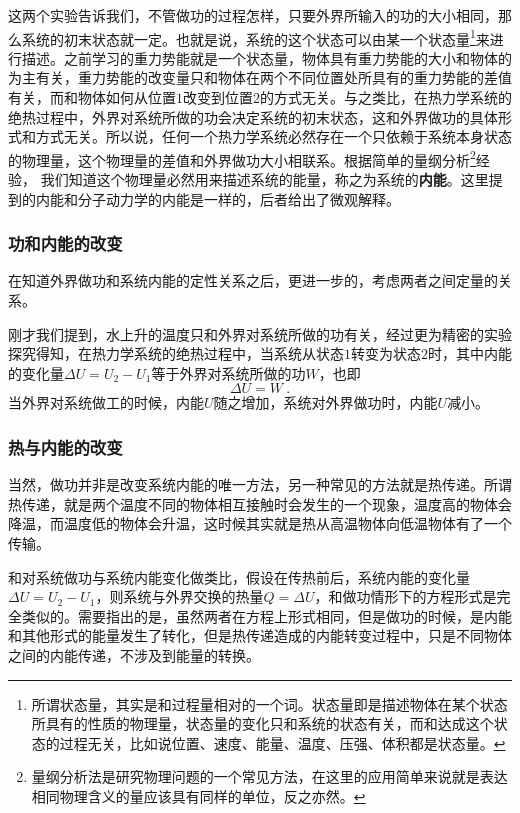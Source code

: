 这两个实验告诉我们，不管做功的过程怎样，只要外界所输入的功的大小相同，那么系统的初末状态就一定。也就是说，系统的这个状态可以由某一个状态量\footnote{所谓状态量，其实是和过程量相对的一个词。状态量即是描述物体在某个状态所具有的性质的物理量，状态量的变化只和系统的状态有关，而和达成这个状态的过程无关，比如说位置、速度、能量、温度、压强、体积都是状态量。}来进行描述。之前学习的重力势能就是一个状态量，物体具有重力势能的大小和物体的为主有关，重力势能的改变量只和物体在两个不同位置处所具有的重力势能的差值有关，而和物体如何从位置$1$改变到位置$2$的方式无关。与之类比，在热力学系统的绝热过程中，外界对系统所做的功会决定系统的初末状态，这和外界做功的具体形式和方式无关。所以说，任何一个热力学系统必然存在一个只依赖于系统本身状态的物理量，这个物理量的差值和外界做功大小相联系。根据简单的量纲分析\footnote{量纲分析法是研究物理问题的一个常见方法，在这里的应用简单来说就是表达相同物理含义的量应该具有同样的单位，反之亦然。}经验，
我们知道这个物理量必然用来描述系统的能量，称之为系统的\textbf{内能}。这里提到的内能和分子动力学的内能是一样的，后者给出了微观解释。

\subsubsection{功和内能的改变}
在知道外界做功和系统内能的定性关系之后，更进一步的，考虑两者之间定量的关系。

刚才我们提到，水上升的温度只和外界对系统所做的功有关，经过更为精密的实验探究得知，在热力学系统的绝热过程中，当系统从状态$1$转变为状态$2$时，其中内能的变化量$\Delta U=U_2-U_1$等于外界对系统所做的功$W$，也即
$$\Delta U=W~.$$
当外界对系统做工的时候，内能$U$随之增加，系统对外界做功时，内能$U$减小。

\subsubsection{热与内能的改变}
当然，做功并非是改变系统内能的唯一方法，另一种常见的方法就是热传递。所谓热传递，就是两个温度不同的物体相互接触时会发生的一个现象，温度高的物体会降温，而温度低的物体会升温，这时候其实就是热从高温物体向低温物体有了一个传输。

和对系统做功与系统内能变化做类比，假设在传热前后，系统内能的变化量$\Delta U=U_2-U_1$，则系统与外界交换的热量$Q=\Delta U$，和做功情形下的方程形式是完全类似的。需要指出的是，虽然两者在方程上形式相同，但是做功的时候，是内能和其他形式的能量发生了转化，但是热传递造成的内能转变过程中，只是不同物体之间的内能传递，不涉及到能量的转换。

